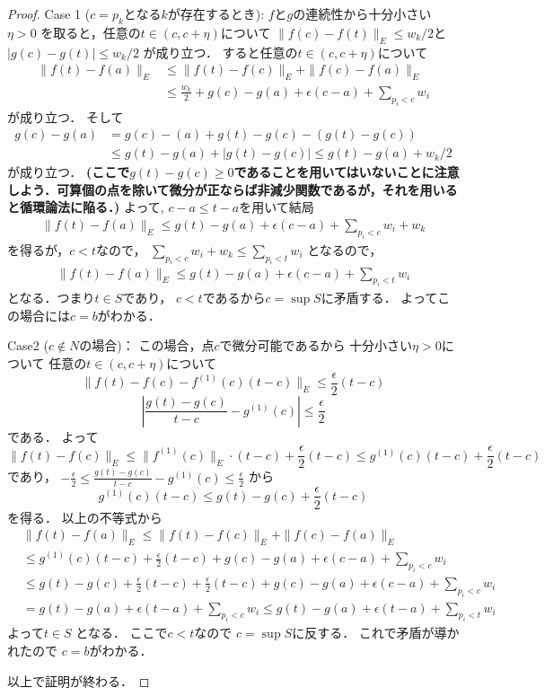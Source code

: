 \documentclass[leqno, a4paper, 12pt]{jsarticle}
\begin{document}
\begin{proof}
Case 1 ($c=p_{k}$となる$k$が存在するとき):
$f$と$g$の連続性から十分小さい$\eta>0$
を取ると，任意の$t\in (c, c+\eta)$について
$\|f(c)-f(t)\|_{E}\le w_{k}/2$と
$|g(c)-g(t)|\le w_{k}/2$
が成り立つ．
すると任意の$t\in (c, c+\eta)$について
\begin{align*}
\|f(t)-f(a)\|_{E}
&\le 
\|f(t)-f(c)\|_{E}+\|f(c)-f(a)\|_{E}
\\
&\le \frac{w_{k}}{2}+
g(c)-g(a)+\epsilon(c-a)+
\sum_{p_{i}<c}w_{i}
\end{align*}
が成り立つ．
そして
\begin{align*}
g(c)-g(a)
&=
g(c)-(a)+g(t)-g(c)-(g(t)-g(c))\\
&\le 
g(t)-g(a)+|g(t)-g(c)|
\le 
g(t)-g(a)+w_{k}/2
\end{align*}
が成り立つ．
\textbf{(ここで$g(t)-g(c)\ge 0$であることを用いてはいないことに注意しよう．可算個の点を除いて微分が正ならば非減少関数であるが，それを用いると循環論法に陥る．)}
よって, $c-a\le t-a$を用いて結局
\begin{align*}
\|f(t)-f(a)\|_{E}
\le 
g(t)-g(a)+\epsilon(c-a)+
\sum_{p_{i}<c}w_{i}+w_{k}
\end{align*}
を得るが，$c<t$なので，
$\sum_{p_{i}<c}w_{i}+w_{k}\le \sum_{p_{i}<t}w_{i}$
となるので，
\begin{align*}
\|f(t)-f(a)\|_{E}
\le 
g(t)-g(a)+\epsilon(c-a)+
\sum_{p_{i}<t}w_{i}
\end{align*}
となる．つまり$t\in S$であり，
$c<t$であるから$c=\sup S$に矛盾する．
よってこの場合には$c=b$がわかる．

Case2 ($c\not\in N$の場合)：
この場合，点$c$で微分可能であるから
十分小さい$\eta>0$について
任意の$t\in (c, c+\eta)$について
\[
\|f(t)-f(c)-f^{(1)}(c)(t-c)\|_{E}\le \frac{\epsilon}{2} (t-c)
\]
\[
\left|\frac{g(t)-g(c)}{t-c}-g^{(1)}(c)\right|\le \frac{\epsilon}{2}
\]
である．
よって
\[
\|f(t)-f(c)\|_{E}\le\|f^{(1)}(c)\|_{E}\cdot (t-c) +\frac{\epsilon}{2} (t-c)\le g^{(1)}(c)(t-c)+
\frac{\epsilon}{2}(t-c)
\]
であり，
$-\frac{\epsilon}{2}
\le \frac{g(t)-g(c)}{t-c}-g^{(1)}(c)\le 
\frac{\epsilon}{2}$
から
\[
g^{(1)}(c)(t-c)\le g(t)-g(c)+ 
\frac{\epsilon}{2}(t-c)
\]
を得る．
以上の不等式から
\begin{align*}
&\|f(t)-f(a)\|_{E}
\le 
\|f(t)-f(c)\|_{E}+\|f(c)-f(a)\|_{E}\\
&\le 
g^{(1)}(c)(t-c)+\frac{\epsilon}{2}(t-c)
+
 g(c)-g(a)+\epsilon(c-a)+
\sum_{p_{i}<c}w_{i}
\\
&\le 
 g(t)-g(c)+ 
\frac{\epsilon}{2}(t-c)
+\frac{\epsilon}{2}(t-c)
+
 g(c)-g(a)+\epsilon(c-a)+
\sum_{p_{i}<c}w_{i}\\
&=g(t)-g(a)+
\epsilon(t-a)+
\sum_{p_{i}<c}w_{i}
\le 
g(t)-g(a)+
\epsilon(t-a)+
\sum_{p_{i}<t}w_{i}
\end{align*}
よって$t\in S$
となる．
ここで$c<t$なので
$c=\sup S$に反する．
これで矛盾が導かれたので
$c=b$がわかる．

以上で証明が終わる．
\end{proof}
\end{document}
